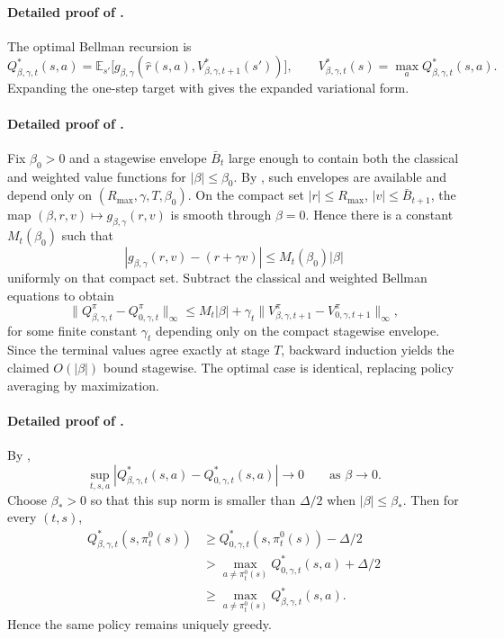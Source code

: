 \documentclass{article}
\theoremstyle{remark}
\newcommand{\E}{\mathbb{E}}
\begin{document}
\paragraph{Detailed proof of .}
The optimal Bellman recursion is
\[
Q_{\beta,\gamma,t}^*(s,a)=\E_{s'}\bigl[g_{\beta,\gamma}(\hat r(s,a),V_{\beta,\gamma,t+1}^*(s'))\bigr],
\qquad
V_{\beta,\gamma,t}^*(s)=\max_a Q_{\beta,\gamma,t}^*(s,a).
\]
Expanding the one-step target with  gives the expanded variational form.

\paragraph{Detailed proof of .}
Fix $\beta_0>0$ and a stagewise envelope $\bar B_t$ large enough to contain both the classical and weighted value functions for $|\beta|\le \beta_0$.
By , such envelopes are available and depend only on $(R_{\max},\gamma,T,\beta_0)$.
On the compact set $|r|\le R_{\max}$, $|v|\le \bar B_{t+1}$, the map $(\beta,r,v)\mapsto g_{\beta,\gamma}(r,v)$ is smooth through $\beta=0$.
Hence there is a constant $M_t(\beta_0)$ such that
\[
|g_{\beta,\gamma}(r,v)-(r+\gamma v)|\le M_t(\beta_0)|\beta|
\]
uniformly on that compact set.
Subtract the classical and weighted Bellman equations to obtain
\[
\|Q_{\beta,\gamma,t}^{\pi}-Q_{0,\gamma,t}^{\pi}\|_\infty
\le M_t|\beta| + \gamma_t\|V_{\beta,\gamma,t+1}^{\pi}-V_{0,\gamma,t+1}^{\pi}\|_\infty,
\]
for some finite constant $\gamma_t$ depending only on the compact stagewise envelope.
Since the terminal values agree exactly at stage $T$, backward induction yields the claimed $O(|\beta|)$ bound stagewise.
The optimal case is identical, replacing policy averaging by maximization.

\paragraph{Detailed proof of .}
By ,
\[
\sup_{t,s,a}|Q^*_{\beta,\gamma,t}(s,a)-Q^*_{0,\gamma,t}(s,a)|\to 0
\qquad \text{as } \beta\to 0.
\]
Choose $\beta_*>0$ so that this sup norm is smaller than $\Delta/2$ when $|\beta|\le \beta_*$.
Then for every $(t,s)$,
\begin{align*}
Q^*_{\beta,\gamma,t}(s,\pi_t^0(s))
&\ge Q^*_{0,\gamma,t}(s,\pi_t^0(s)) - \Delta/2\\
&> \max_{a\neq \pi_t^0(s)}Q^*_{0,\gamma,t}(s,a)+\Delta/2\\
&\ge \max_{a\neq \pi_t^0(s)}Q^*_{\beta,\gamma,t}(s,a).
\end{align*}
Hence the same policy remains uniquely greedy.
\end{document}

